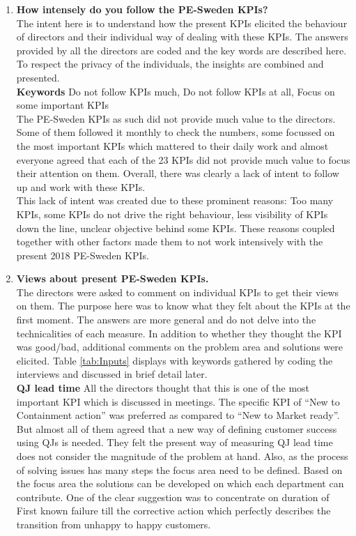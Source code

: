 \begin{enumerate}
    \item \textbf{How intensely do you follow the PE-Sweden KPIs?}\\
    
    The intent here is to understand how the present KPIs elicited the behaviour of directors and their individual way of dealing with these KPIs. The answers provided by all the directors are coded and the key words are described here. To respect the privacy of the individuals, the insights are combined and presented.\\
    
    \textbf{Keywords} Do not follow KPIs much, Do not follow KPIs at all, Focus on some important KPIs\\
    
    The PE-Sweden KPIs as such did not provide much value to the directors. Some of them followed it monthly to check the numbers, some focussed on the most important KPIs which mattered to their daily work and almost everyone agreed that each of the 23 KPIs did not provide much value to focus their attention on them. Overall, there was clearly a lack of intent to follow up and work with these KPIs.\\
    
    This lack of intent was created due to these prominent reasons:
Too many KPIs, some KPIs do not drive the right behaviour, less visibility of KPIs down the line, unclear objective behind some KPIs. These reasons coupled together with other factors made them to not work intensively with the present 2018 PE-Sweden KPIs.\\

\item \textbf{Views about present PE-Sweden KPIs.}\\

The directors were asked to comment on individual KPIs to get their views on them. The purpose here was to know what they felt about the KPIs at the first moment. The answers are more general and do not delve into the technicalities of each measure. In addition to whether they thought the KPI was good/bad, additional comments on the problem area and solutions were elicited. Table \ref{tab:Inputs} displays with keywords gathered by coding the interviews and discussed in brief detail later.\\


\textbf{QJ lead time} 
All the directors thought that this is one of the most important KPI which is discussed in meetings. The specific KPI of “New to Containment action” was preferred as compared to “New to Market ready”. But almost all of them agreed that a new way of defining customer success using QJs is needed. They felt the present way of measuring QJ lead time does not consider the magnitude of the problem at hand. Also, as the process of solving issues has many steps the focus area need to be defined. Based on the focus area the solutions can be developed on which each department can contribute. One of the clear suggestion was to concentrate on duration of First known failure till the corrective action which perfectly describes the transition from unhappy to happy customers.\\


\end{enumerate}
